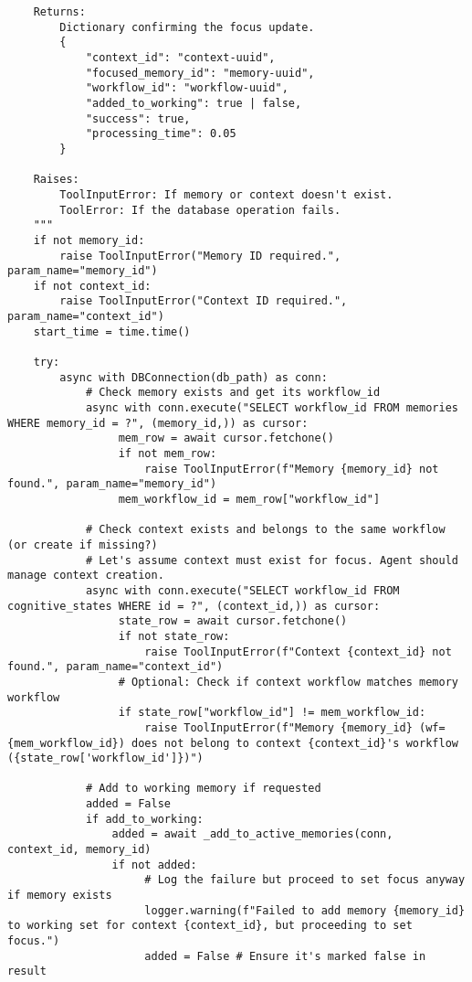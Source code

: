 \documentclass[12pt,a4paper]{article}
\begin{document}
\begin{pageablecode}
\begin{verbatim}
    Returns:
        Dictionary confirming the focus update.
        {
            "context_id": "context-uuid",
            "focused_memory_id": "memory-uuid",
            "workflow_id": "workflow-uuid",
            "added_to_working": true | false,
            "success": true,
            "processing_time": 0.05
        }

    Raises:
        ToolInputError: If memory or context doesn't exist.
        ToolError: If the database operation fails.
    """
    if not memory_id: 
        raise ToolInputError("Memory ID required.", param_name="memory_id")
    if not context_id: 
        raise ToolInputError("Context ID required.", param_name="context_id")
    start_time = time.time()

    try:
        async with DBConnection(db_path) as conn:
            # Check memory exists and get its workflow_id
            async with conn.execute("SELECT workflow_id FROM memories WHERE memory_id = ?", (memory_id,)) as cursor:
                 mem_row = await cursor.fetchone()
                 if not mem_row: 
                     raise ToolInputError(f"Memory {memory_id} not found.", param_name="memory_id")
                 mem_workflow_id = mem_row["workflow_id"]

            # Check context exists and belongs to the same workflow (or create if missing?)
            # Let's assume context must exist for focus. Agent should manage context creation.
            async with conn.execute("SELECT workflow_id FROM cognitive_states WHERE id = ?", (context_id,)) as cursor:
                 state_row = await cursor.fetchone()
                 if not state_row: 
                     raise ToolInputError(f"Context {context_id} not found.", param_name="context_id")
                 # Optional: Check if context workflow matches memory workflow
                 if state_row["workflow_id"] != mem_workflow_id:
                     raise ToolInputError(f"Memory {memory_id} (wf={mem_workflow_id}) does not belong to context {context_id}'s workflow ({state_row['workflow_id']})")

            # Add to working memory if requested
            added = False
            if add_to_working:
                added = await _add_to_active_memories(conn, context_id, memory_id)
                if not added:
                     # Log the failure but proceed to set focus anyway if memory exists
                     logger.warning(f"Failed to add memory {memory_id} to working set for context {context_id}, but proceeding to set focus.")
                     added = False # Ensure it's marked false in result


\end{verbatim}
\end{pageablecode}
\end{document}
